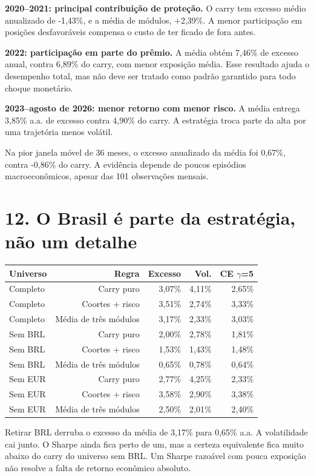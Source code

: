 \documentclass[11pt,a4paper]{article}
\begin{document}
\textbf{2020--2021: principal contribuição de proteção.} O carry tem excesso médio anualizado de -1,43\%, e a média de módulos, +2,39\%. A menor participação em posições desfavoráveis compensa o custo de ter ficado de fora antes.

\textbf{2022: participação em parte do prêmio.} A média obtém 7,46\% de excesso anual, contra 6,89\% do carry, com menor exposição média. Esse resultado ajuda o desempenho total, mas não deve ser tratado como padrão garantido para todo choque monetário.

\textbf{2023--agosto de 2026: menor retorno com menor risco.} A média entrega 3,85\% a.a. de excesso contra 4,90\% do carry. A estratégia troca parte da alta por uma trajetória menos volátil.

Na pior janela móvel de 36 meses, o excesso anualizado da média foi 0,67\%, contra -0,86\% do carry. A evidência depende de poucos episódios macroeconômicos, apesar das 101 observações mensais.

\clearpage
\section*{12. O Brasil é parte da estratégia, não um detalhe}
\small\begin{center}\begin{tabular}{lrrrr}\toprule Universo & Regra & Excesso & Vol. & CE $\gamma$=5\\\midrule 
Completo & Carry puro & 3,07\% & 4,11\% & 2,65\%\\
Completo & Coortes + risco & 3,51\% & 2,74\% & 3,33\%\\
Completo & Média de três módulos & 3,17\% & 2,33\% & 3,03\%\\
Sem BRL & Carry puro & 2,00\% & 2,78\% & 1,81\%\\
Sem BRL & Coortes + risco & 1,53\% & 1,43\% & 1,48\%\\
Sem BRL & Média de três módulos & 0,65\% & 0,78\% & 0,64\%\\
Sem EUR & Carry puro & 2,77\% & 4,25\% & 2,33\%\\
Sem EUR & Coortes + risco & 3,58\% & 2,90\% & 3,38\%\\
Sem EUR & Média de três módulos & 2,50\% & 2,01\% & 2,40\%\\\bottomrule\end{tabular}\end{center}\normalsize

Retirar BRL derruba o excesso da média de 3,17\% para 0,65\% a.a. A volatilidade cai junto. O Sharpe ainda fica perto de um, mas a certeza equivalente fica muito abaixo do carry do universo sem BRL. Um Sharpe razoável com pouca exposição não resolve a falta de retorno econômico absoluto.
\end{document}
